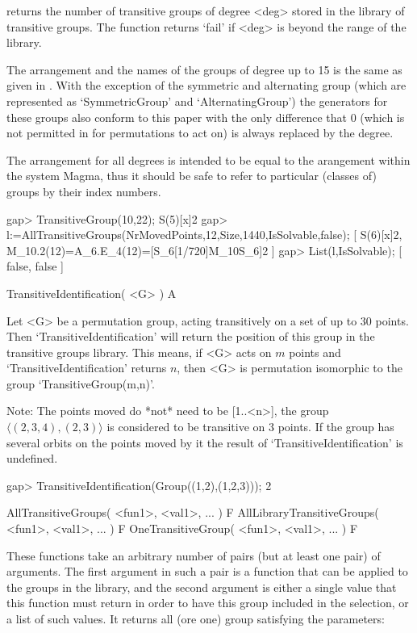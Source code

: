 returns the number of transitive groups of degree <deg> stored in the
library of transitive groups. The function returns `fail' if <deg> is
beyond the range of the library.

The arrangement and the names of the groups of degree up to 15 is the same
as given in \cite{ConwayHulpkeMcKay98}. With the exception of the symmetric
and alternating group (which are represented as `SymmetricGroup' and
`AlternatingGroup') the generators for these groups also conform to this
paper with the only difference that 0 (which is not permitted in {\GAP} for
permutations to act on) is always replaced by the degree.

The arrangement for all degrees is intended to be equal to the arangement
within the system Magma, thus it should be safe to refer to particular
(classes of) groups by their index numbers.

\beginexample
gap> TransitiveGroup(10,22);
S(5)[x]2
gap> l:=AllTransitiveGroups(NrMovedPoints,12,Size,1440,IsSolvable,false);
[ S(6)[x]2, M_10.2(12)=A_6.E_4(12)=[S_6[1/720]{M_10}S_6]2 ]
gap> List(l,IsSolvable);
[ false, false ]
\endexample

\>TransitiveIdentification( <G> ) A

Let <G> be a permutation group, acting transitively on a set  of up to 30
points.  Then `TransitiveIdentification' will return the position of this
group in the transitive  groups library.  This means,  if <G> acts on
$m$ points and    `TransitiveIdentification'  returns $n$,  then <G>   is
permutation isomorphic to the group `TransitiveGroup(m,n)'.

Note: The points moved do *not* need to be [1..<n>], the group
$\langle (2,3,4),(2,3)\rangle$ is considered to be transitive on 3
points. If the group has several orbits on the points moved by it the
result of `TransitiveIdentification' is undefined.


\beginexample
gap> TransitiveIdentification(Group((1,2),(1,2,3)));
2
\endexample


\>AllTransitiveGroups( <fun1>, <val1>, ... ) F
\>AllLibraryTransitiveGroups( <fun1>, <val1>, ... ) F
\>OneTransitiveGroup( <fun1>, <val1>, ... ) F

These functions take an arbitrary number of pairs (but at least one pair)
of arguments. The first argument in such a pair is a function that can be
applied to the groups in the library, and the second argument is either a
single value that this function must return in order to have  this  group
included in the selection, or a list of such  values. 
It returns all (ore one) group satisfying the parameters:

